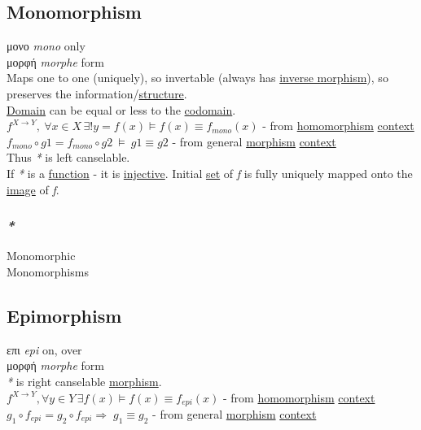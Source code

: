 \documentclass[a4paper,14pt,oneside]{book}
\begin{document}
{\subsection{\label{orgd36a478}Monomorphism}
\label{sec:orgd1ed5b6}
μονο \emph{mono} only\\
μορφή \emph{morphe} form\\

Maps one to one (uniquely), so invertable (always has \hyperref[org0c21660]{inverse morphism}), so preserves the information/\hyperref[org080800e]{structure}.\\
\hyperref[org17b9ae1]{Domain} can be equal or less to the \hyperref[org746d351]{codomain}.\\

\(f^{X \to Y}, \ \forall x \in X \, \exists! y=f(x) \vDash f(x) \equiv f_{mono}(x)\) - from \hyperref[org203620e]{homomorphism} \hyperref[orgae1fb98]{context}\\
\(f_{mono} \circ g1 = f_{mono} \circ g2 \ \vDash \ g1 \equiv g2\) - from general \hyperref[orgc09f1a4]{morphism} \hyperref[orgae1fb98]{context}\\
Thus \emph{*} is left canselable.\\

If \emph{*} is a \hyperref[org6a60524]{function} - it is \hyperref[org4302f95]{injective}. Initial \hyperref[org0726f94]{set} of \emph{f} is fully uniquely mapped onto the \hyperref[org270220b]{image} of \emph{f}.\\

\subsubsection{\emph{*}}
\label{sec:orgffe568a}

\label{orgce17a43}Monomorphic\\
\label{org50d40f2}Monomorphisms\\

\subsection{\label{org1979081}Epimorphism}
\label{sec:org1eddd5e}
επι \emph{epi} on, over\\
μορφή \emph{morphe} form\\

\emph{*} is right canselable \hyperref[orgc09f1a4]{morphism}.\\
\(f^{X \to Y}, \forall y \in Y \, \exists f(x) \vDash f(x) \equiv f_{epi}(x)\) - from \hyperref[org203620e]{homomorphism} \hyperref[orgae1fb98]{context}\\
\(g_1 \circ f_{epi} = g_2 \circ f_{epi} \Rightarrow \; g_1 \equiv g_2\) - from general \hyperref[orgc09f1a4]{morphism} \hyperref[orgae1fb98]{context}\\

}
\end{document}
